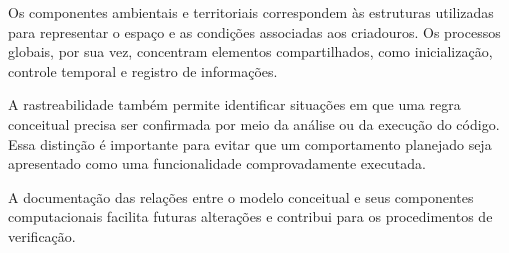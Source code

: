 Os componentes ambientais e territoriais correspondem às estruturas utilizadas para representar o espaço e as condições associadas aos criadouros. Os processos globais, por sua vez, concentram elementos compartilhados, como inicialização, controle temporal e registro de informações.

A rastreabilidade também permite identificar situações em que uma regra conceitual precisa ser confirmada por meio da análise ou da execução do código. Essa distinção é importante para evitar que um comportamento planejado seja apresentado como uma funcionalidade comprovadamente executada.

A documentação das relações entre o modelo conceitual e seus componentes computacionais facilita futuras alterações e contribui para os procedimentos de verificação.

